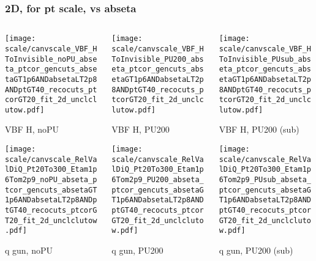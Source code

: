 \documentclass[8pt]{beamer}
\begin{document}
   \begin{frame}
  \frametitle{2D, for pt scale, vs abseta}
  
  \begin{columns}
   \begin{column}{0.35\textwidth}
     \texttt{[image: scale/canvscale\_VBF\_HToInvisible\_noPU\_abseta\_ptcor\_gencuts\_absetaGT1p6ANDabsetaLT2p8ANDptGT40\_recocuts\_ptcorGT20\_fit\_2d\_unclclutow.pdf]}
     
     VBF H, noPU
    
     \texttt{[image: scale/canvscale\_RelValDiQ\_Pt20To300\_Etam1p6Tom2p9\_noPU\_abseta\_ptcor\_gencuts\_absetaGT1p6ANDabsetaLT2p8ANDptGT40\_recocuts\_ptcorGT20\_fit\_2d\_unclclutow.pdf]}
     
     q gun, noPU
   \end{column}
   \begin{column}{0.35\textwidth}
     \texttt{[image: scale/canvscale\_VBF\_HToInvisible\_PU200\_abseta\_ptcor\_gencuts\_absetaGT1p6ANDabsetaLT2p8ANDptGT40\_recocuts\_ptcorGT20\_fit\_2d\_unclclutow.pdf]}
     
     VBF H, PU200
    
     \texttt{[image: scale/canvscale\_RelValDiQ\_Pt20To300\_Etam1p6Tom2p9\_PU200\_abseta\_ptcor\_gencuts\_absetaGT1p6ANDabsetaLT2p8ANDptGT40\_recocuts\_ptcorGT20\_fit\_2d\_unclclutow.pdf]}
     
     q gun, PU200
   \end{column}
   \begin{column}{0.35\textwidth}
     \texttt{[image: scale/canvscale\_VBF\_HToInvisible\_PUsub\_abseta\_ptcor\_gencuts\_absetaGT1p6ANDabsetaLT2p8ANDptGT40\_recocuts\_ptcorGT20\_fit\_2d\_unclclutow.pdf]}
     
     VBF H, PU200 (sub)
    
     \texttt{[image: scale/canvscale\_RelValDiQ\_Pt20To300\_Etam1p6Tom2p9\_PUsub\_abseta\_ptcor\_gencuts\_absetaGT1p6ANDabsetaLT2p8ANDptGT40\_recocuts\_ptcorGT20\_fit\_2d\_unclclutow.pdf]}
     
     q gun, PU200 (sub)
   \end{column}
  \end{columns}
 \end{frame}
 
\end{document}
